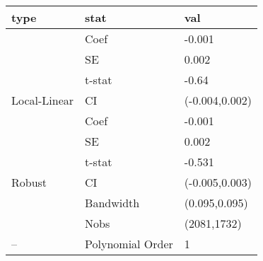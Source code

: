 
\begin{tabular}{lll}
\toprule
type & stat & val\\
\midrule
 & Coef & -0.001\\

 & SE & 0.002\\

 & t-stat & -0.64\\

\multirow{-4}{*}{\raggedright\arraybackslash Local-Linear} & CI & (-0.004,0.002)\\
\cmidrule{1-3}
 & Coef & -0.001\\

 & SE & 0.002\\

 & t-stat & -0.531\\

\multirow{-4}{*}{\raggedright\arraybackslash Robust} & CI & (-0.005,0.003)\\
\cmidrule{1-3}
 & Bandwidth & (0.095,0.095)\\

 & Nobs & (2081,1732)\\

\multirow{-3}{*}{\raggedright\arraybackslash --} & Polynomial Order & 1\\
\bottomrule
\end{tabular}